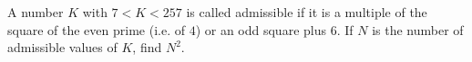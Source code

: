 A number $K$ with $7<K<257$ is called admissible if it is a multiple of the square of the even prime (i.e. of $4$) or an odd square plus $6$. If $N$ is the number of admissible values of $K$, find $N^2$.

